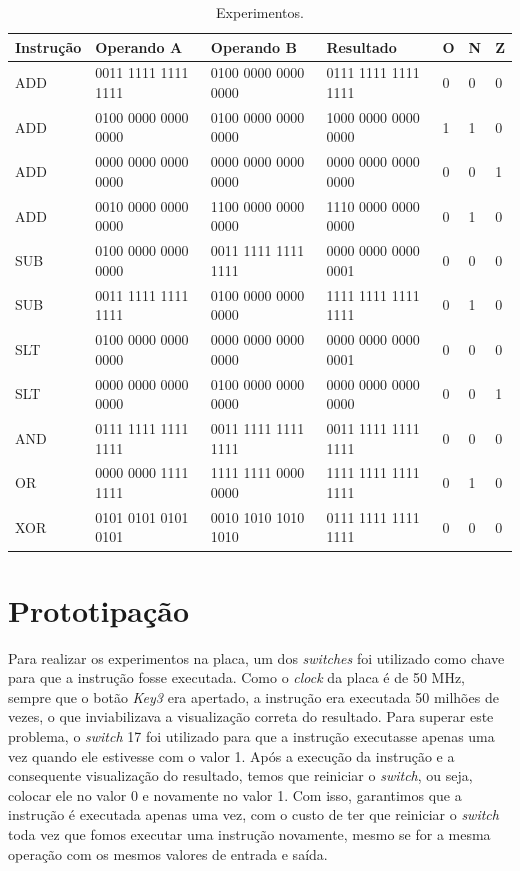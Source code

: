 \documentclass[11pt,a4paper,titlepage]{article}
\begin{document}
\begin{table}[t]
\centering
\begin{tabular}{|l|l|l|l|l|l|l|}
\hline
Instrução & Operando A & Operando B & Resultado & O & N & Z \\
\hline
ADD & 0011 1111 1111 1111 & 0100 0000 0000 0000 & 0111 1111 1111 1111 & 0 & 0 & 0 \\
ADD & 0100 0000 0000 0000 & 0100 0000 0000 0000 & 1000 0000 0000 0000 & 1 & 1 & 0 \\
ADD & 0000 0000 0000 0000 & 0000 0000 0000 0000 & 0000 0000 0000 0000 & 0 & 0 & 1 \\
ADD & 0010 0000 0000 0000 & 1100 0000 0000 0000 & 1110 0000 0000 0000 & 0 & 1 & 0 \\
SUB & 0100 0000 0000 0000 & 0011 1111 1111 1111 & 0000 0000 0000 0001 & 0 & 0 & 0 \\
SUB & 0011 1111 1111 1111 & 0100 0000 0000 0000 & 1111 1111 1111 1111 & 0 & 1 & 0 \\
SLT & 0100 0000 0000 0000 & 0000 0000 0000 0000 & 0000 0000 0000 0001 & 0 & 0 & 0 \\
SLT & 0000 0000 0000 0000 & 0100 0000 0000 0000 & 0000 0000 0000 0000 & 0 & 0 & 1 \\
AND & 0111 1111 1111 1111 & 0011 1111 1111 1111 & 0011 1111 1111 1111 & 0 & 0 & 0 \\
OR  & 0000 0000 1111 1111 & 1111 1111 0000 0000 & 1111 1111 1111 1111 & 0 & 1 & 0 \\
XOR & 0101 0101 0101 0101 & 0010 1010 1010 1010 & 0111 1111 1111 1111 & 0 & 0 & 0 \\
\hline
\end{tabular}
\caption{Experimentos.}
\label{tab:experiments}
\end{table}
%

\section{Prototipação}

Para realizar os experimentos na placa, um dos \textit{switches} foi utilizado como chave para que a instrução fosse executada.
Como o \textit{clock} da placa é de 50 MHz, sempre que o botão \textit{Key3} era apertado, a instrução era executada 50 milhões de vezes, o que inviabilizava a visualização correta do resultado.
Para superar este problema, o \textit{switch} 17 foi utilizado para que a instrução executasse apenas uma vez quando ele estivesse com o valor 1.
Após a execução da instrução e a consequente visualização do resultado, temos que reiniciar o \textit{switch}, ou seja, colocar ele no valor 0 e novamente no valor 1.
Com isso, garantimos que a instrução é executada apenas uma vez, com o custo de ter que reiniciar o \textit{switch} toda vez que fomos executar uma instrução novamente, mesmo se for a mesma operação com os mesmos valores de entrada e saída.
\end{document}
